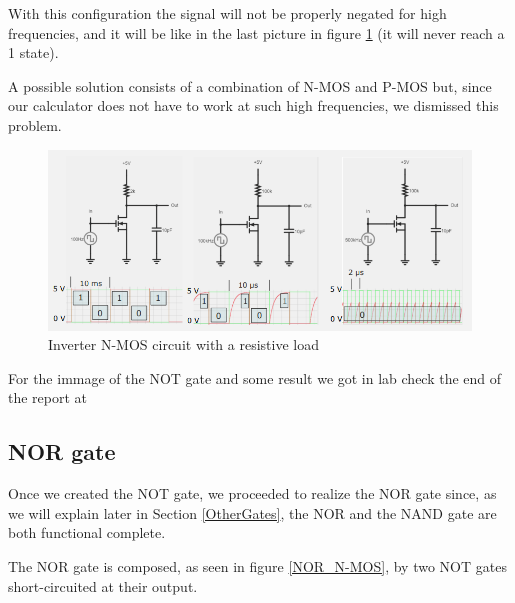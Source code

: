 \documentclass{article}
\begin{document}
With this configuration the signal will not be properly negated for high frequencies, and it will be like in the last picture in figure \ref{ResistiveInverter} (it will never reach a 1 state).

A possible solution consists of a combination of N-MOS and P-MOS but, since our calculator does not have to work at such high frequencies, we dismissed this problem.

\begin{figure}[h]
    \centering
    \includegraphics[scale=0.6]{IM_inverter_esa.PNG}
    \caption{Inverter N-MOS circuit with a resistive load}
    \label{ResistiveInverter}
\end{figure}

For the immage of the NOT gate and some result we got in lab check the end of the report at %


\clearpage
\subsection{NOR gate}

Once we created the NOT gate, we proceeded to realize the NOR gate since, as we will explain later in Section \ref{OtherGates}, the NOR and the NAND gate are both functional complete.

\vspace{1mm}

The NOR gate is composed, as seen in figure \ref{NOR_N-MOS}, by two NOT gates short-circuited at their output.
\end{document}
